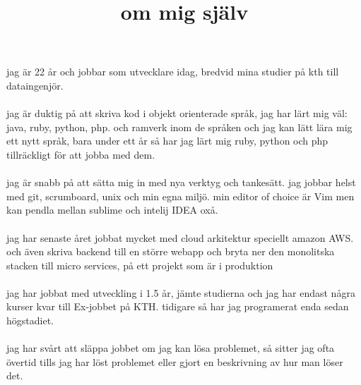 \documentclass{article}
\title{om mig sj{\"a}lv}
\begin{document}
\maketitle
jag är 22 år och jobbar som utvecklare idag, bredvid mina studier på kth till dataingenjör.
\\\\
jag är duktig på att skriva kod i objekt orienterade språk, jag har lärt mig väl: java, ruby, python, php. och ramverk inom de språken och jag kan lätt lära mig ett nytt språk, bara under ett år så har jag lärt mig ruby, python och php tillräckligt för att jobba med dem.
\\\\
jag är snabb på att sätta mig in med nya verktyg och tankesätt. jag jobbar helst med git, scrumboard, unix och min egna miljö. min editor of choice är Vim men kan pendla mellan sublime och intelij IDEA oxå.
\\\\
jag har senaste året jobbat mycket med cloud arkitektur speciellt amazon AWS.
och även skriva backend till en större webapp och bryta ner den monolitska stacken till micro services, på ett projekt som är i produktion
\\\\ 
jag har jobbat med utveckling i 1.5 år, jämte studierna och jag har endast några kurser kvar till Ex-jobbet på KTH. tidigare så har jag programerat enda sedan högstadiet.
\\\\
jag har svårt att släppa jobbet om jag kan lösa problemet, så sitter jag ofta övertid tills jag har löst problemet eller gjort en beskrivning av hur man löser det.
\end{document}
